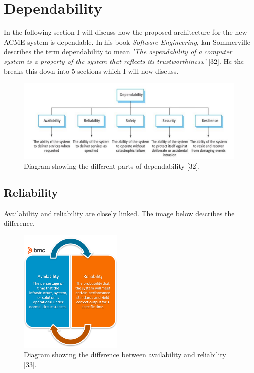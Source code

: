 \section{Dependability}
  \label{sec:Dependability}
  In the following section I will discuss how the proposed architecture for the new ACME system is dependable. In his book \textit{Software Engineering}, Ian 
  Sommerville describes the term dependability to mean \textit{'The dependability of a computer system is a property of the system that reflects its 
  trustworthiness.'} [32]. He the breaks this down into 5 sections which I will now discuss.

  \begin{figure}[H]
    \centering
    \includegraphics[width=12cm]{assets/dependability.png}
    \caption{Diagram showing the different parts of dependability [32].}
    \label{fig:dependability}
  \end{figure}

  \subsection{Reliability}
  Availability and reliability are closely linked. The image below describes the difference.
  \begin{figure}[H]
    \centering
    \includegraphics[width=5cm]{assets/avail-reliab.png}
    \caption{Diagram showing the difference between availability and reliability [33].}
    \label{fig:availabilityVsReliability}
  \end{figure}

